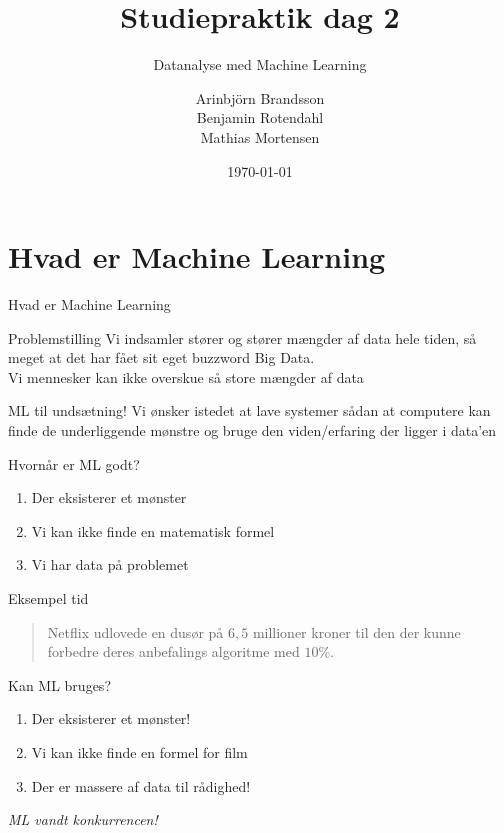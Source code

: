 \documentclass[12pt,t]{beamer}
\title{Studiepraktik dag 2}
\subtitle{Datanalyse med Machine Learning}
\author{
        Arinbjörn Brandsson \\
        Benjamin Rotendahl  \\
        Mathias Mortensen
}
\date[]{\today}
\begin{document}
\frame[plain]{\titlepage}
 \frame{\tableofcontents}

 \section{Hvad er Machine Learning}
     \begin{frame}[t]{Hvad er Machine Learning}
         \begin{block}{Problemstilling}
             Vi indsamler stører og stører mængder af data hele tiden, så meget
             at det har fået sit eget buzzword \alert{Big Data}. \\
             \pause
             Vi mennesker kan ikke overskue så store mængder af data
         \end{block}

         \pause

         \begin{block}{ML til undsætning!}
             Vi ønsker istedet at lave systemer sådan at computere kan finde de
             underliggende mønstre og bruge den viden/erfaring der ligger i data'en
         \end{block}

         \pause

         \begin{block}{Hvornår er ML godt?}
             \begin{enumerate}
                 \item Der eksisterer et mønster \pause
                 \item Vi kan ikke finde en matematisk formel \pause
                 \item Vi har data på problemet
             \end{enumerate}
         \end{block}
     \end{frame}

     \begin{frame}[t]{Eksempel tid}
         \begin{quote}
             Netflix udlovede en dusør på $6,5$ millioner kroner til den der
             kunne forbedre deres anbefalings algoritme med $10\%$.
         \end{quote}

         \pause

         \begin{block}{Kan ML bruges?}
             \begin{enumerate}
                 \item Der eksisterer et mønster! \pause
                 \item Vi kan ikke finde en formel for film \pause
                 \item Der er massere af data til rådighed!
             \end{enumerate}
         \end{block}
         \pause
         \centering \emph{ML vandt konkurrencen!}
     \end{frame}
\end{document}
